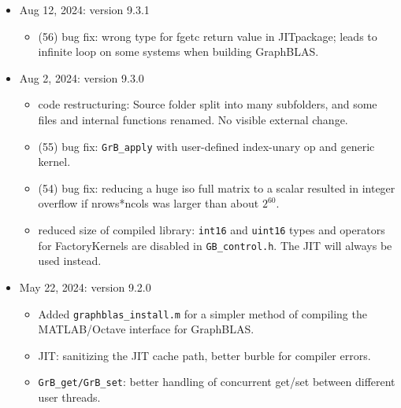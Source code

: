 \begin{itemize}
    \begin{itemize}
    \item new operator and associated methods:
        added the draft \verb'G*B_IndexBinaryOp'.
    \item JIT error-handling behavior changed:  if a compiler error occurs in
        the JIT, \verb'GxB_JIT_ERROR' is now returned.  Previously, GraphBLAS
        would fall back to a generic method if such an error occurred.
    \end{itemize}

\item Aug 12, 2024: version 9.3.1

    \begin{itemize}
    \item (56) bug fix:  wrong type for fgetc return value in JITpackage; leads
        to infinite loop on some systems when building GraphBLAS.
    \end{itemize}

\item Aug 2, 2024: version 9.3.0

    \begin{itemize}
    \item code restructuring:  Source folder split into many subfolders, and
        some files and internal functions renamed.  No visible external change.
    \item (55) bug fix: \verb'GrB_apply' with user-defined index-unary op and
        generic kernel.
    \item (54) bug fix: reducing a huge iso full matrix to a scalar resulted in
        integer overflow if nrows*ncols was larger than about $2^{60}$.
    \item reduced size of compiled library: \verb'int16' and \verb'uint16'
        types and operators for FactoryKernels are disabled in
        \verb'GB_control.h'.  The JIT will always be used instead.
    \end{itemize}

\item May 22, 2024: version 9.2.0

    \begin{itemize}
    \item Added \verb'graphblas_install.m' for a simpler method of compiling
        the MATLAB/Octave interface for GraphBLAS.
    \item JIT: sanitizing the JIT cache path, better burble for compiler errors.
    \item \verb'GrB_get/GrB_set': better handling of concurrent get/set between
        different user threads.
    \end{itemize}


\end{itemize}
